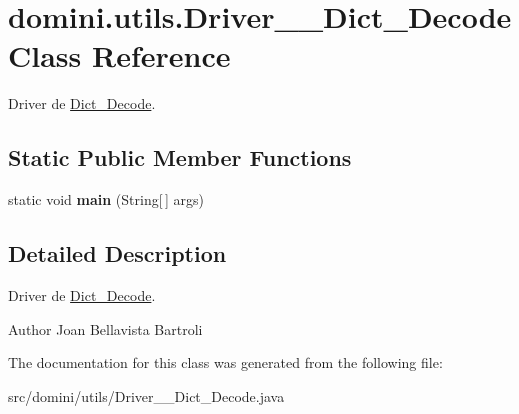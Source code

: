 \hypertarget{classdomini_1_1utils_1_1Driver____Dict__Decode}{}\section{domini.\+utils.\+Driver\+\_\+\+\_\+\+Dict\+\_\+\+Decode Class Reference}
\label{classdomini_1_1utils_1_1Driver____Dict__Decode}


Driver de \hyperlink{classdomini_1_1utils_1_1Dict__Decode}{Dict\+\_\+\+Decode}.  


\subsection*{Static Public Member Functions}
\begin{DoxyCompactItemize}
\item 
\mbox{\label{classdomini_1_1utils_1_1Driver____Dict__Decode_a5045c12e35617afd929dfeb30930d541}} 
static void {\bfseries main} (String\mbox{[}$\,$\mbox{]} args)
\end{DoxyCompactItemize}


\subsection{Detailed Description}
Driver de \hyperlink{classdomini_1_1utils_1_1Dict__Decode}{Dict\+\_\+\+Decode}. 

\begin{DoxyAuthor}{Author}
Joan Bellavista Bartroli 
\end{DoxyAuthor}


The documentation for this class was generated from the following file\+:\begin{DoxyCompactItemize}
\item 
src/domini/utils/Driver\+\_\+\+\_\+\+Dict\+\_\+\+Decode.\+java\end{DoxyCompactItemize}
